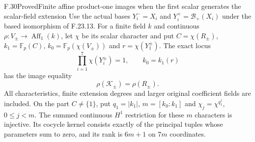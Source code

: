 \begin{claim}{F.30}{Proved}{Finite affine product-one images when the first scalar generates the scalar-field extension}
Use the actual bases $Y_i^-=X_i$ and
$Y_i^+=\mathcal B_+(X_i)$ under the based
isomorphism of F.23.13.
For a finite field $k$ and continuous
$\rho:V_\pm\to\operatorname{Aff}_1(k)$, let
$\chi$ be its scalar character and put
$C=\chi(R_\pm)$,
$k_1=\mathbb F_p(C)$,
$k_0=\mathbb F_p(\chi(V_\pm))$ and
$r=\chi(Y_1^\pm)$.
The exact locus
\[
             \prod_{i=1}^7\chi(Y_i^\pm)=1,
                    \qquad k_0=k_1(r)
                                                               \tag{F.30.1}
\]
has the image equality
\[
                         \rho(\mathcal K_\pm)=\rho(R_\pm).
                                                               \tag{F.30.2}
\]
All characteristics, finite extension degrees
and larger original coefficient fields are included.
On the part $C\ne\{1\}$, put
$q_1=|k_1|$, $m=[k_0:k_1]$ and
$\chi_j=\chi^{q_1^j}$, $0\leq j<m$.
The summed continuous $H^1$ restriction for
these $m$ characters is injective. Its cocycle
kernel consists exactly of the principal tuples
whose parameters sum to zero, and its rank is
$6m+1$ on $7m$ coordinates.
\end{claim}

